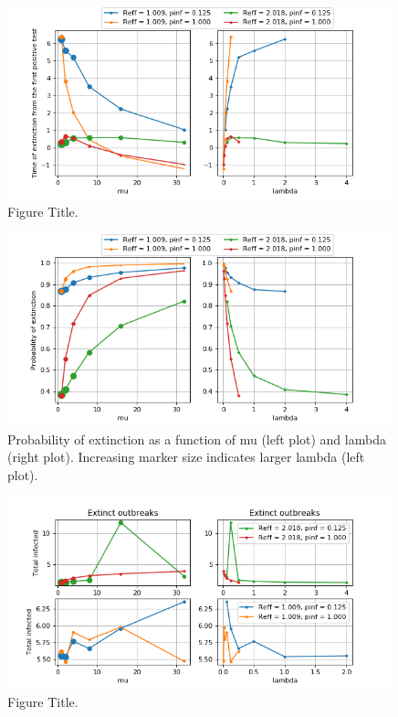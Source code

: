 \documentclass[sr]{drdc-report}
\begin{document}
\begin{figure}
  \includegraphics[width=0.99\textwidth, keepaspectratio=true]{figures/text_exp1}
  \caption{Figure Title.}\label{fig_plt_textExp1}
\end{figure}


\begin{figure}
  \includegraphics[width=0.99\textwidth, keepaspectratio=true]{figures/pext_exp1}
  \caption{Probability of extinction as a function of mu (left plot) and lambda (right plot). Increasing marker size indicates larger lambda (left plot).}\label{fig_plt_pextExp1}
\end{figure}

\begin{figure}
  \includegraphics[width=0.99\textwidth, keepaspectratio=true]{figures/NinfExt_exp1}
  \caption{Figure Title.}\label{fig_plt_NinfExtExp1}
\end{figure}
\end{document}
